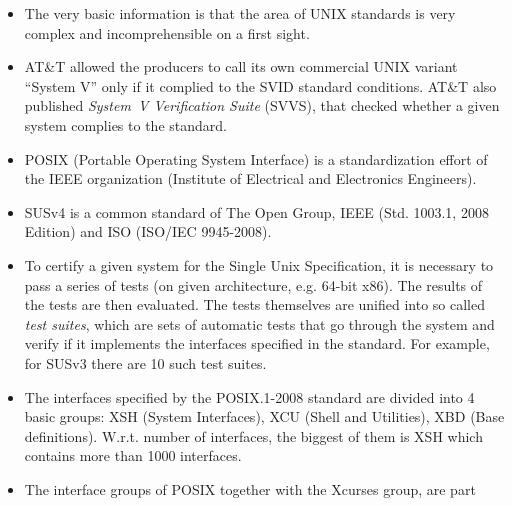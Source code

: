 \documentclass[article]{seminar}
\newcommand{\sltitle}[1]{{\centering\textbf{\Large #1}
    \vskip 2em plus 0pt minus 2em\par}} %
\newcommand{\emsl}[1]{\textbf{#1}} %
\begin{document}



\label{UNIXSTANDARDS}

\begin{itemize}
\item The very basic information is that the area of UNIX standards is very
complex and incomprehensible on a first sight.
\item AT\&T allowed the producers to call its own commercial UNIX variant
``System V'' only if it complied to the SVID standard conditions. AT\&T also
published \emph{System~V Verification Suite} (SVVS), that checked whether a given
system complies to the standard.
\item POSIX (Portable Operating System Interface) is a standardization effort
of the IEEE organization (Institute of Electrical and Electronics Engineers).
\item SUSv4 is a common standard of The Open Group, IEEE (Std. 1003.1, 2008
Edition) and ISO (ISO/IEC 9945-2008).
\item To certify a given system for the Single Unix Specification, it is necessary
to pass a series of tests (on given architecture, e.g. 64-bit x86).
The results of the tests are then evaluated. The tests themselves are unified into
so called \emph{test suites}, which are sets of automatic tests that go through
the system and verify if it implements the interfaces specified in the standard.
For example, for SUSv3 there are 10 such test suites.
\item The interfaces specified by the POSIX.1-2008 standard are divided into 4
basic groups: XSH (System Interfaces), XCU (Shell and Utilities), XBD
(Base definitions). W.r.t. number of interfaces, the biggest of them is XSH which
contains more than 1000 interfaces.
\item The interface groups of POSIX together with the Xcurses group, are part

\end{itemize}
\end{document}
